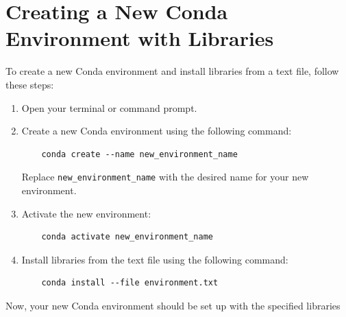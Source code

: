 \documentclass[a4paper]{article}
\begin{document}
\section*{Creating a New Conda Environment with Libraries}

To create a new Conda environment and install libraries from a text file, follow these steps:

\begin{enumerate}
    \item Open your terminal or command prompt.
    
    \item Create a new Conda environment using the following command:
    
    \begin{verbatim}
    conda create --name new_environment_name
    \end{verbatim}
    
    Replace \texttt{new\_environment\_name} with the desired name for your new environment.
    
    \item Activate the new environment:
    
    \begin{verbatim}
    conda activate new_environment_name
    \end{verbatim}
    
    \item Install libraries from the text file using the following command:
    
    \begin{verbatim}
    conda install --file environment.txt
    \end{verbatim}
    
    
\end{enumerate}

Now, your new Conda environment should be set up with the specified libraries
\end{document}
